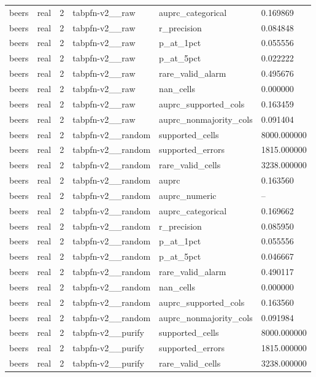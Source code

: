 \begin{tabular}{llllll}
beers & real & 2 & tabpfn-v2\_\_raw & auprc\_categorical & 0.169869 \\
beers & real & 2 & tabpfn-v2\_\_raw & r\_precision & 0.084848 \\
beers & real & 2 & tabpfn-v2\_\_raw & p\_at\_1pct & 0.055556 \\
beers & real & 2 & tabpfn-v2\_\_raw & p\_at\_5pct & 0.022222 \\
beers & real & 2 & tabpfn-v2\_\_raw & rare\_valid\_alarm & 0.495676 \\
beers & real & 2 & tabpfn-v2\_\_raw & nan\_cells & 0.000000 \\
beers & real & 2 & tabpfn-v2\_\_raw & auprc\_supported\_cols & 0.163459 \\
beers & real & 2 & tabpfn-v2\_\_raw & auprc\_nonmajority\_cols & 0.091404 \\
beers & real & 2 & tabpfn-v2\_\_random & supported\_cells & 8000.000000 \\
beers & real & 2 & tabpfn-v2\_\_random & supported\_errors & 1815.000000 \\
beers & real & 2 & tabpfn-v2\_\_random & rare\_valid\_cells & 3238.000000 \\
beers & real & 2 & tabpfn-v2\_\_random & auprc & 0.163560 \\
beers & real & 2 & tabpfn-v2\_\_random & auprc\_numeric & -- \\
beers & real & 2 & tabpfn-v2\_\_random & auprc\_categorical & 0.169662 \\
beers & real & 2 & tabpfn-v2\_\_random & r\_precision & 0.085950 \\
beers & real & 2 & tabpfn-v2\_\_random & p\_at\_1pct & 0.055556 \\
beers & real & 2 & tabpfn-v2\_\_random & p\_at\_5pct & 0.046667 \\
beers & real & 2 & tabpfn-v2\_\_random & rare\_valid\_alarm & 0.490117 \\
beers & real & 2 & tabpfn-v2\_\_random & nan\_cells & 0.000000 \\
beers & real & 2 & tabpfn-v2\_\_random & auprc\_supported\_cols & 0.163560 \\
beers & real & 2 & tabpfn-v2\_\_random & auprc\_nonmajority\_cols & 0.091984 \\
beers & real & 2 & tabpfn-v2\_\_purify & supported\_cells & 8000.000000 \\
beers & real & 2 & tabpfn-v2\_\_purify & supported\_errors & 1815.000000 \\
beers & real & 2 & tabpfn-v2\_\_purify & rare\_valid\_cells & 3238.000000 \\

\end{tabular}
